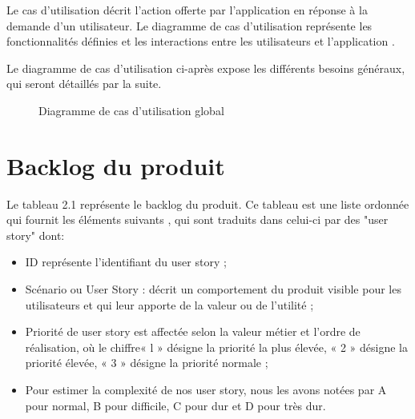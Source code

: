      Le cas d’utilisation décrit l’action offerte par l’application en réponse à la demande d’un utilisateur.
     Le diagramme de cas d’utilisation représente les fonctionnalités définies et les interactions entre les utilisateurs et l’application \cite{usecaseUml}.
   
       Le diagramme de cas d'utilisation ci-après expose les différents besoins généraux, qui seront détaillés par la suite.
      \begin{figure}[htpb]
\centering
\caption{Diagramme de cas d'utilisation global}
\label{fig:Diagrammedecasd'utilisationgénéral}
\end{figure}
 


\newpage



     \section{Backlog du produit}
Le tableau 2.1 représente le backlog du produit. Ce tableau est une liste ordonnée qui fournit les éléments suivants
, qui sont traduits dans celui-ci par des "user story" dont: 
 \begin{itemize}
\item ID  représente l’identifiant du user story ;
\item Scénario ou User Story : décrit un comportement du produit visible pour les utilisateurs et
qui leur apporte de la valeur ou de l’utilité ;
\item Priorité de user story est affectée selon la valeur métier et l’ordre de réalisation, où le
chiffre\newline « l » désigne la priorité la plus élevée, « 2 » désigne la priorité élevée, « 3 » désigne la priorité normale ;
\item Pour estimer la complexité de nos user story, nous les avons notées par A pour normal, B pour difficile, C pour dur et D pour très dur.

\end {itemize}


